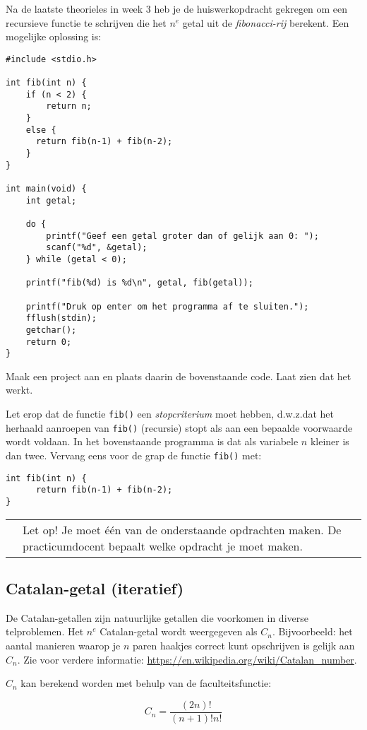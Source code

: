 \documentclass[a4paper,10pt,fleqn,twoside]{article}
\newcommand{\letop}{%
\vspace*{2ex}
\begin{mdframed}[outerlinewidth = 1 ,%
roundcorner = 4 pt,%
leftmargin = 40,%
rightmargin = 40,%
backgroundcolor = yellow!40,%
outerlinecolor = red!70!black,%
innertopmargin = \topskip,%
splittopskip = \topskip,%
]
\begin{tabularx}{\linewidth}{m{1cm}X}
\Large\leftpointright & Let op! Je moet één van de onderstaande opdrachten maken. De practicumdocent bepaalt welke opdracht je moet maken.
\end{tabularx}
\end{mdframed}
}
\begin{document}
Na de laatste theorieles in week 3 heb je de huiswerkopdracht gekregen om een recursieve functie te schrijven die het $n^e$ getal uit de \textsl{fibonacci-rij} berekent. Een mogelijke oplossing is:

\begin{lstlisting}
#include <stdio.h>

int fib(int n) {
    if (n < 2) {
        return n;
	}
	else {
	  return fib(n-1) + fib(n-2);
	}
} 

int main(void) {
    int getal;

    do {
        printf("Geef een getal groter dan of gelijk aan 0: ");
        scanf("%d", &getal);
    } while (getal < 0);

    printf("fib(%d) is %d\n", getal, fib(getal));

    printf("Druk op enter om het programma af te sluiten.");
    fflush(stdin);
    getchar();
    return 0;
}
\end{lstlisting}

Maak een project aan en plaats daarin de bovenstaande code. Laat zien dat het werkt.

Let erop dat de functie \lstinline|fib()| een \textsl{stopcriterium} moet hebben, d.w.z.\@ dat het herhaald aanroepen van \lstinline|fib()| (recursie) stopt als aan een bepaalde voorwaarde wordt voldaan. In het bovenstaande programma is dat als variabele $n$ kleiner is dan twee. Vervang eens voor de grap de functie \lstinline|fib()| met:

\begin{lstlisting}
int fib(int n) {
      return fib(n-1) + fib(n-2);
} 
\end{lstlisting}



\letop

\subsection{Catalan-getal (iteratief)}
De Catalan-getallen zijn natuurlijke getallen die voorkomen in diverse telproblemen. Het $n^e$ Catalan-getal wordt weergegeven als $C_n$. Bijvoorbeeld: het aantal manieren waarop je $n$ paren haakjes correct kunt opschrijven is gelijk aan $C_n$. Zie voor verdere informatie: \url{https://en.wikipedia.org/wiki/Catalan_number}.

$C_n$ kan berekend worden met behulp van de faculteitsfunctie: 

\begin{equation*}
C_n = \dfrac{(2n)!}{(n+1)!n!}
\end{equation*}
\end{document}
